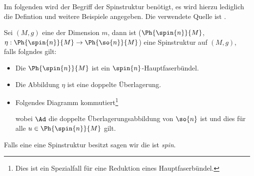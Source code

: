 Im folgenden wird der Begriff der Spinstruktur benötigt, es wird
hierzu lediglich die Defintion und weitere Beispiele angegeben.
Die verwendete Quelle ist \cite{BHMMM15}.

\begin{Def}[Spinstruktur]
	Sei $(M,g)$ eine \RMF der Dimension $m$, dann ist
	 ($\Ph{\spin{n}}{M}$,$\eta : \Ph{\spin{n}}{M} \rightarrow \Ph{\so{n}}{M}$) eine Spinstruktur auf $(M,g)$, falls folgndes gilt:
	 \begin{itemize}
	 	\item Die \mfg $\Ph{\spin{n}}{M}$ ist ein $\spin{n}$-Hauptfaserbündel.
	 	\item Die Abbildung $\eta$ ist eine doppelte Überlagerung.
	 	\item Folgendes Diagramm kommutiert\footnote{Dies ist ein Spezialfall für eine Reduktion eines Hauptfaserbündel.}\\
		 	\begin{center}
			 \end{center}
			wobei $\Ad$ die doppelte Überlagerungsabbildung von $\so{n}$ ist
			und dies für alle $u \in \Ph{\spin{n}}{M}$ gilt.
	 \end{itemize}
	 Falls eine \RMF eine Spinstruktur besitzt sagen wir die \mfg ist \textit{spin}.
	

\end{Def}

